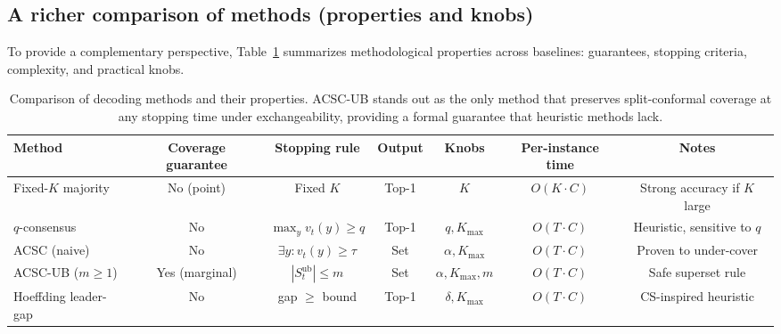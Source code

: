 \documentclass[11pt]{article}
\begin{document}
\subsection{A richer comparison of methods (properties and knobs)}
To provide a complementary perspective, Table~\ref{tab:compare} summarizes methodological properties across baselines: guarantees, stopping criteria, complexity, and practical knobs.

\vspace{0.5em}
\begin{table}[htbp]
\centering
\small
\caption{Comparison of decoding methods and their properties. ACSC-UB stands out as the only method that preserves split-conformal coverage at any stopping time under exchangeability, providing a formal guarantee that heuristic methods lack.}
\vspace{0.5em}
\begin{adjustbox}{max width=\linewidth}
\begin{tabular}{lcccccc}
\toprule
Method & Coverage guarantee & Stopping rule & Output & Knobs & Per-instance time & Notes \\
\midrule
Fixed-$K$ majority & No (point) & Fixed $K$ & Top-1 & $K$ & $O(K\cdot C)$ & Strong accuracy if $K$ large \\
$q$-consensus & No & $\max_y v_t(y)\ge q$ & Top-1 & $q,K_{\max}$ & $O(T\cdot C)$ & Heuristic, sensitive to $q$ \\
ACSC (naive) & No & $\exists y: v_t(y)\ge\tau$ & Set & $\alpha,K_{\max}$ & $O(T\cdot C)$ & Proven to under-cover \\
ACSC-UB ($m\ge 1$) & Yes (marginal) & $|S^{\text{ub}}_t|\le m$ & Set & $\alpha,K_{\max},m$ & $O(T\cdot C)$ & Safe superset rule \\
Hoeffding leader-gap & No & gap $\ge$ bound & Top-1 & $\delta,K_{\max}$ & $O(T\cdot C)$ & CS-inspired heuristic \\
\bottomrule
\end{tabular}
\end{adjustbox}
\label{tab:compare}
\end{table}
\vspace{0.5em}
\end{document}
